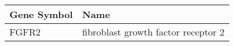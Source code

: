 \begin{tabular}{ll}
\toprule
Gene Symbol &                                Name \\
\midrule
      FGFR2 & fibroblast growth factor receptor 2 \\
\bottomrule
\end{tabular}
